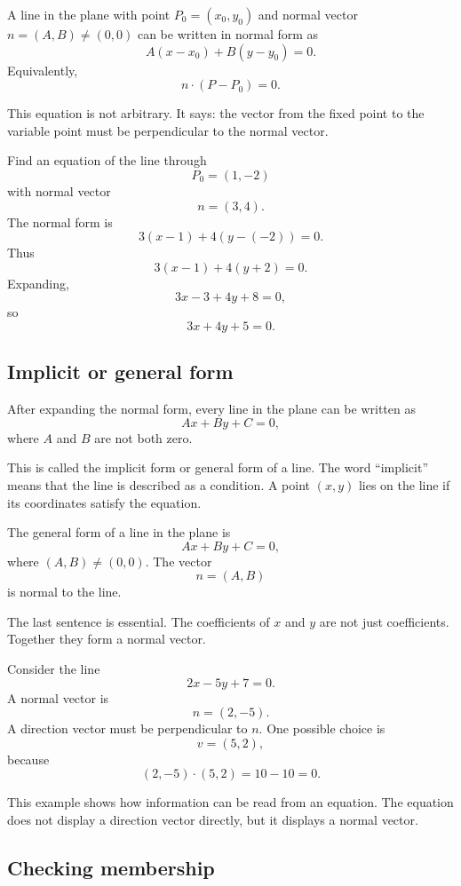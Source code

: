 \begin{definitionbox}
A line in the plane with point \(P_0=(x_0,y_0)\) and normal vector \(n=(A,B)\ne(0,0)\) can be written in normal form as
\[
A(x-x_0)+B(y-y_0)=0.
\]
Equivalently,
\[
n\cdot(P-P_0)=0.
\]
\end{definitionbox}

This equation is not arbitrary. It says: the vector from the fixed point to the variable point must be perpendicular to the normal vector.

\begin{examplebox}
Find an equation of the line through
\[
P_0=(1,-2)
\]
with normal vector
\[
n=(3,4).
\]
The normal form is
\[
3(x-1)+4(y-(-2))=0.
\]
Thus
\[
3(x-1)+4(y+2)=0.
\]
Expanding,
\[
3x-3+4y+8=0,
\]
so
\[
3x+4y+5=0.
\]
\end{examplebox}

\subsection*{Implicit or general form}

After expanding the normal form, every line in the plane can be written as
\[
Ax+By+C=0,
\]
where \(A\) and \(B\) are not both zero.

This is called the implicit form or general form of a line. The word ``implicit'' means that the line is described as a condition. A point \((x,y)\) lies on the line if its coordinates satisfy the equation.

\begin{definitionbox}
The general form of a line in the plane is
\[
Ax+By+C=0,
\]
where \((A,B)\ne(0,0)\). The vector
\[
n=(A,B)
\]
is normal to the line.
\end{definitionbox}

The last sentence is essential. The coefficients of \(x\) and \(y\) are not just coefficients. Together they form a normal vector.

\begin{examplebox}
Consider the line
\[
2x-5y+7=0.
\]
A normal vector is
\[
n=(2,-5).
\]
A direction vector must be perpendicular to \(n\). One possible choice is
\[
v=(5,2),
\]
because
\[
(2,-5)\cdot(5,2)=10-10=0.
\]
\end{examplebox}

This example shows how information can be read from an equation. The equation does not display a direction vector directly, but it displays a normal vector.

\subsection*{Checking membership}

